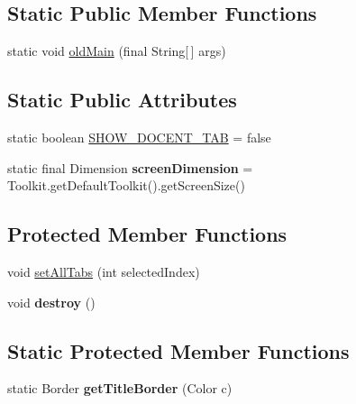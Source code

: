\subsection*{Static Public Member Functions}
\begin{DoxyCompactItemize}
\item 
static void \hyperlink{classgov_1_1fnal_1_1ppd_1_1dd_1_1ChannelSelector_abcdca0952f08ae15f3debb8ae8a7d999}{old\-Main} (final String\mbox{[}$\,$\mbox{]} args)
\end{DoxyCompactItemize}
\subsection*{Static Public Attributes}
\begin{DoxyCompactItemize}
\item 
static boolean \hyperlink{classgov_1_1fnal_1_1ppd_1_1dd_1_1ChannelSelector_ad9e88d31f70467252e90a59943338df0}{S\-H\-O\-W\-\_\-\-D\-O\-C\-E\-N\-T\-\_\-\-T\-A\-B} = false
\item 
\hypertarget{classgov_1_1fnal_1_1ppd_1_1dd_1_1ChannelSelector_a78f6040f260da659faca3b09d0617e7e}{static final Dimension {\bfseries screen\-Dimension} = Toolkit.\-get\-Default\-Toolkit().get\-Screen\-Size()}\label{classgov_1_1fnal_1_1ppd_1_1dd_1_1ChannelSelector_a78f6040f260da659faca3b09d0617e7e}

\end{DoxyCompactItemize}
\subsection*{Protected Member Functions}
\begin{DoxyCompactItemize}
\item 
void \hyperlink{classgov_1_1fnal_1_1ppd_1_1dd_1_1ChannelSelector_abba1a8a5599959eb2e7a905f6bfd1685}{set\-All\-Tabs} (int selected\-Index)
\item 
\hypertarget{classgov_1_1fnal_1_1ppd_1_1dd_1_1ChannelSelector_a72b3571d9e3fda6bba926fc732c583b1}{void {\bfseries destroy} ()}\label{classgov_1_1fnal_1_1ppd_1_1dd_1_1ChannelSelector_a72b3571d9e3fda6bba926fc732c583b1}

\end{DoxyCompactItemize}
\subsection*{Static Protected Member Functions}
\begin{DoxyCompactItemize}
\item 
\hypertarget{classgov_1_1fnal_1_1ppd_1_1dd_1_1ChannelSelector_a984845b48df72e93fb62ca3d36701ba4}{static Border {\bfseries get\-Title\-Border} (Color c)}\label{classgov_1_1fnal_1_1ppd_1_1dd_1_1ChannelSelector_a984845b48df72e93fb62ca3d36701ba4}

\end{DoxyCompactItemize}
